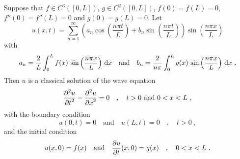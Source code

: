 \begin{theorem} \label{wave_spv_conditions}
Suppose that $\displaystyle f \in C^3([0,L])$,
$\displaystyle g\in C^2([0,L])$, $f(0)=f(L)=0$,
$f''(0)=f''(L)=0$ and $g(0)=g(L)=0$.  Let
\begin{equation} \label{wave_class_sol1}
u(x,t) = \sum_{n=1}^\infty \left(a_n\cos\left(\frac{n\pi t}{L}\right)
+ b_n \sin\left(\frac{n\pi t}{L}\right)\right)
\sin\left(\frac{n\pi x}{L}\right)
\end{equation}
with
\[
a_n = \frac{2}{L} \int_0^L f(x) \,\sin\left(\frac{n\pi x}{L}\right)
\,\mathrm{d}{x} \quad \text{and} \quad
b_n = \frac{2}{n\pi} \int_0^L g(x)\, \sin\left(\frac{n\pi x}{L}\right)
\,\mathrm{d}{x} \ .
\]
Then $u$ is a classical solution of the wave equation
\begin{equation} \label{wave_class_sol2}
\frac{\displaystyle \partial^{2}{u}} {\displaystyle \partial t^{2}} - \frac{\displaystyle \partial^{2}{u}} {\displaystyle \partial x^{2}} = 0 \quad , \quad t>0 \text{ and }
0<x<L \ ,
\end{equation}
with the boundary condition
\[
u(0,t) = 0 \quad \text{and} \quad u(L,t) = 0 \quad , \quad t>0 \  ,
\]
and the initial condition
\[
u(x,0) = f(x) \quad \text{and} \quad \frac{\partial{u}}{\partial t}(x,0) = g(x) \quad ,
\quad 0 < x < L \ .
\]
\end{theorem}

